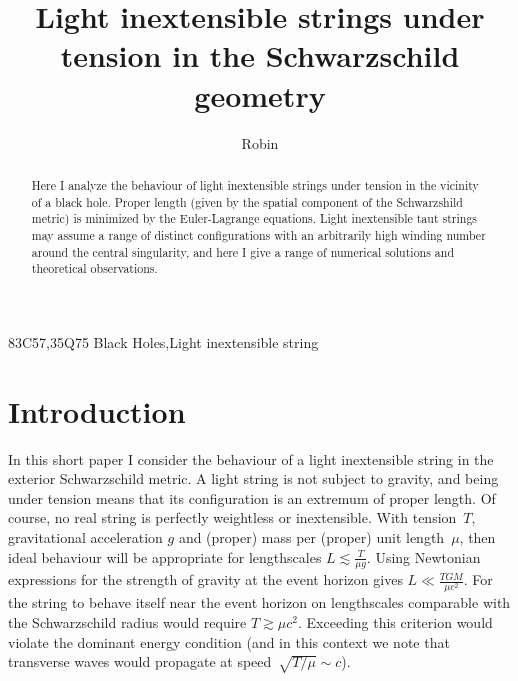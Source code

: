 \documentclass[times,twocolumn,final]{elsarticle}
\begin{document}

\begin{frontmatter}

\title{Light inextensible strings under tension in the Schwarzschild geometry}

\author[1]{Robin }

\address[1]{Auckland University of Technology, 2-14 Wakefield Street,
  Auckland 1142, New Zealand}




\begin{abstract}
Here I analyze the behaviour of light inextensible strings under
tension in the vicinity of a black hole.  Proper length (given by the
spatial component of the Schwarzshild metric) is minimized by the
Euler-Lagrange equations.  Light inextensible taut strings may assume
a range of distinct configurations with an arbitrarily high winding
number around the central singularity, and here I give a range of
numerical solutions and theoretical observations.
\end{abstract}

\begin{keyword}
\MSC 83C57\sep 35Q75
\KWD Black Holes\sep Light inextensible string
\end{keyword}

\end{frontmatter}


\section{Introduction}
\label{intro}
In this short paper I consider the behaviour of a light inextensible
string in the exterior Schwarzschild metric.  A light string is not
subject to gravity, and being under tension means that its
configuration is an extremum of proper length.  Of course, no real
string is perfectly weightless or inextensible.  With tension~$T$,
gravitational acceleration $g$ and (proper) mass per (proper) unit
length~$\mu$, then ideal behaviour will be appropriate for
lengthscales $L\lesssim\frac{T}{\mu g}$.  Using Newtonian expressions
for the strength of gravity at the event horizon gives
$L\ll\frac{TGM}{\mu c^2}$.  For the string to behave itself near the
event horizon on lengthscales comparable with the Schwarzschild radius
would require $T\gtrsim\mu c^2$.  Exceeding this criterion would
violate the dominant energy condition (and in this context we note
that transverse waves would propagate at speed~$\sqrt{T/\mu}\sim c$).
\end{document}

